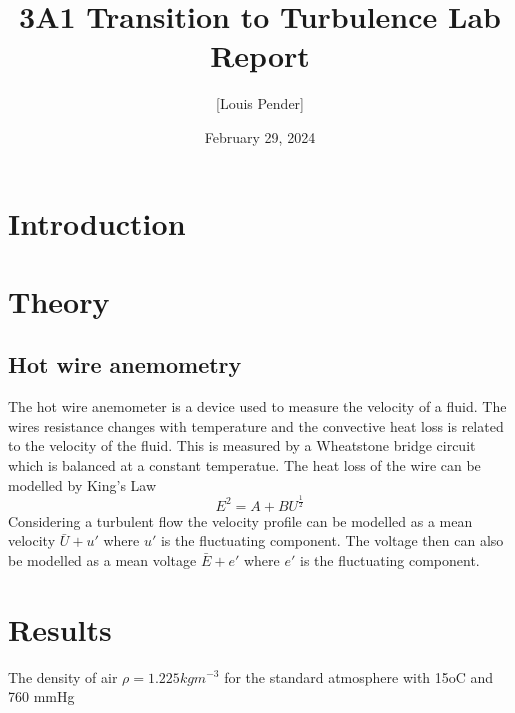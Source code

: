 \documentclass{article}
\title{3A1 Transition to Turbulence Lab Report}
\author{[Louis Pender]}
\date{February 29, 2024}
\begin{document}
\maketitle

\section{Introduction}



\section{Theory}

\subsection{Hot wire anemometry}

The hot wire anemometer is a device used to measure the velocity of a fluid.
The wires resistance changes with temperature and the convective heat loss is related to the velocity of the fluid.
This is measured by a Wheatstone bridge circuit which is balanced at a constant temperatue.
The heat loss of the wire can be modelled by King's Law
\begin{equation}
    E^2 = A + B U^{\frac{1}{2}}
\end{equation}
Considering a turbulent flow the velocity profile can be modelled as a mean velocity $\bar{U} + u'$ where $u'$ is the fluctuating component.
The voltage then can also be modelled as a mean voltage $\bar{E} + e'$ where $e'$ is the fluctuating component.




\section{Results}

The density of air $\rho = 1.225kgm^{-3}$ for the standard atmosphere with 15oC and 760 mmHg
\end{document}
